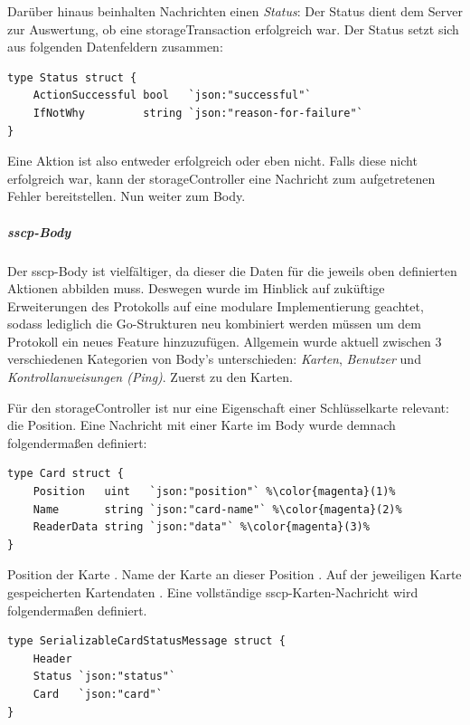 \noindent
Darüber hinaus beinhalten Nachrichten einen \textit{Status}: Der Status dient dem Server zur Auswertung, ob eine \gls{storageTransaction} erfolgreich war. Der Status setzt sich aus folgenden Datenfeldern zusammen:
\begin{lstlisting}[style=goMono, caption={SSCP Status Objekt}]
type Status struct {
	ActionSuccessful bool   `json:"successful"`
	IfNotWhy         string `json:"reason-for-failure"`
}
\end{lstlisting}
Eine Aktion ist also entweder erfolgreich oder eben nicht. Falls diese nicht erfolgreich war, kann der \gls{storageController} eine Nachricht zum aufgetretenen Fehler bereitstellen.
Nun weiter zum Body.

\subparagraph{\acrshort{sscp}-Body}
Der \acrshort{sscp}-Body ist vielfältiger, da dieser die Daten für die jeweils oben definierten Aktionen abbilden muss. Deswegen wurde im Hinblick auf zuküftige Erweiterungen des Protokolls auf eine modulare Implementierung geachtet, sodass lediglich die Go-Strukturen neu kombiniert werden müssen um dem Protokoll ein neues Feature hinzuzufügen. Allgemein wurde aktuell zwischen 3 verschiedenen Kategorien von Body's unterschieden: \textit{Karten}, \textit{Benutzer} und \textit{Kontrollanweisungen (Ping)}. Zuerst zu den Karten.\bigskip

\noindent
Für den \gls{storageController} ist nur eine Eigenschaft einer Schlüsselkarte relevant: die Position. Eine Nachricht mit einer Karte im Body wurde demnach folgendermaßen definiert:
\begin{lstlisting}[style=goMono, caption={SSCP Karten Objekt}]
type Card struct {
    Position   uint   `json:"position"` %\color{magenta}(1)%
    Name       string `json:"card-name"` %\color{magenta}(2)%
    ReaderData string `json:"data"` %\color{magenta}(3)%
}
\end{lstlisting}
Position der Karte . Name der Karte an dieser Position . Auf der jeweiligen Karte gespeicherten Kartendaten . Eine vollständige \acrshort{sscp}-Karten-Nachricht wird folgendermaßen definiert.
\begin{lstlisting}[style=goMono, caption={Vollständiges, modular aufgebautes, Karten-Nachricht Objekt}, label={lst:impl:controller:fullCardStatusMessage}]
type SerializableCardStatusMessage struct {
    Header
    Status `json:"status"`
    Card   `json:"card"`
}
\end{lstlisting}
\newpage
